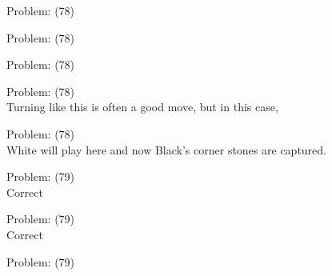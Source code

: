 \documentclass[11pt]{article}
\begin{document}
\begin{minipage}[t]{0.5\textwidth}
  {\centering
  
Problem: (78)\\
  }
\end{minipage}
\begin{minipage}[t]{0.5\textwidth}
  {\centering
  
Problem: (78)\\
  }
\end{minipage}
\begin{minipage}[t]{0.5\textwidth}
  {\centering
  
Problem: (78)\\
  }
\end{minipage}
\begin{minipage}[t]{0.5\textwidth}
  {\centering
  
Problem: (78)\\
Turning like this is often a good move, but in this case,\\
  }
\end{minipage}
\begin{minipage}[t]{0.5\textwidth}
  {\centering
  
Problem: (78)\\
White will play here and now Black's corner stones are captured.\\
  }
\end{minipage}
\begin{minipage}[t]{0.5\textwidth}
  {\centering
  
Problem: (79)\\
Correct\\
  }
\end{minipage}
\begin{minipage}[t]{0.5\textwidth}
  {\centering
  
Problem: (79)\\
Correct\\
  }
\end{minipage}
\begin{minipage}[t]{0.5\textwidth}
  {\centering
  
Problem: (79)\\
  }
\end{minipage}
\end{document}
